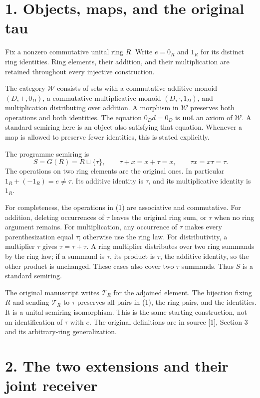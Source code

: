 \documentclass[
]{article}
\begin{document}
\section{1. Objects, maps, and the original
tau}\label{objects-maps-and-the-original-tau}

Fix a nonzero commutative unital ring \(R\). Write \(e=0_R\) and \(1_R\)
for its distinct ring identities. Ring elements, their addition, and
their multiplication are retained throughout every injective
construction.

The category \(\mathcal W\) consists of sets with a commutative additive
monoid \((D,+,0_D)\), a commutative multiplicative monoid
\((D,\cdot,1_D)\), and multiplication distributing over addition. A
morphism in \(\mathcal W\) preserves both operations and both
identities. The equation \(0_Dd=0_D\) is \textbf{not} an axiom of
\(\mathcal W\). A standard semiring here is an object also satisfying
that equation. Whenever a map is allowed to preserve fewer identities,
this is stated explicitly.

The programme semiring is \[
S=G(R)=R\sqcup\{\tau\},\qquad
\tau+x=x+\tau=x,\qquad \tau x=x\tau=\tau.
\tag{1}
\] The operations on two ring elements are the original ones. In
particular \(1_R+(-1_R)=e\ne\tau\). Its additive identity is \(\tau\),
and its multiplicative identity is \(1_R\).

For completeness, the operations in (1) are associative and commutative.
For addition, deleting occurrences of \(\tau\) leaves the original ring
sum, or \(\tau\) when no ring argument remains. For multiplication, any
occurrence of \(\tau\) makes every parenthesization equal \(\tau\);
otherwise use the ring law. For distributivity, a multiplier \(\tau\)
gives \(\tau=\tau+\tau\). A ring multiplier distributes over two ring
summands by the ring law; if a summand is \(\tau\), its product is
\(\tau\), the additive identity, so the other product is unchanged.
These cases also cover two \(\tau\) summands. Thus \(S\) is a standard
semiring.

The original manuscript writes \(\mathcal T_R\) for the adjoined
element. The bijection fixing \(R\) and sending \(\mathcal T_R\) to
\(\tau\) preserves all pairs in (1), the ring pairs, and the identities.
It is a unital semiring isomorphism. This is the same starting
construction, not an identification of \(\tau\) with \(e\). The original
definitions are in source {[}1{]}, Section 3 and its arbitrary-ring
generalization.

\section{2. The two extensions and their joint
receiver}\label{the-two-extensions-and-their-joint-receiver}
\end{document}
